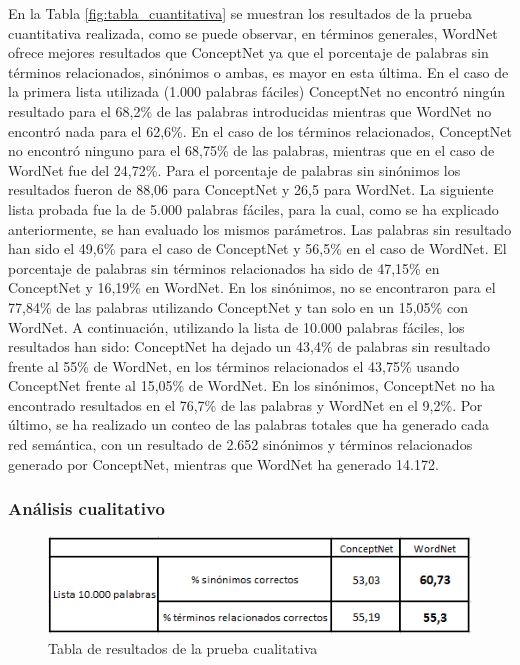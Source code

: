 En la Tabla \ref{fig:tabla_cuantitativa} se muestran los resultados de la prueba cuantitativa realizada, como se puede observar, en términos generales, WordNet ofrece mejores resultados que ConceptNet ya que el porcentaje de palabras sin términos relacionados, sinónimos o ambas, es mayor en esta última. En el caso de la primera lista utilizada (1.000 palabras fáciles) ConceptNet no encontró ningún resultado para el 68,2\% de las palabras introducidas mientras que WordNet no encontró nada para el 62,6\%. En el caso de los términos relacionados, ConceptNet no encontró ninguno para el 68,75\% de las palabras, mientras que en el caso de WordNet fue del 24,72\%. Para el porcentaje de palabras sin sinónimos los resultados fueron de 88,06 para ConceptNet y 26,5 para WordNet. La siguiente lista probada fue la de 5.000 palabras fáciles, para la cual, como se ha explicado anteriormente, se han evaluado los mismos parámetros. Las palabras sin resultado han sido el 49,6\% para el caso de ConceptNet y 56,5\% en el caso de WordNet. El porcentaje de palabras sin términos relacionados ha sido de 47,15\% en ConceptNet y 16,19\% en WordNet. En los sinónimos, no se encontraron para el 77,84\% de las palabras utilizando ConceptNet  y tan solo en un 15,05\% con WordNet. A continuación, utilizando la lista de 10.000 palabras fáciles, los resultados han sido: ConceptNet ha dejado un 43,4\% de palabras sin resultado frente al 55\% de WordNet, en los términos relacionados el 43,75\% usando ConceptNet  frente al 15,05\% de WordNet. En los sinónimos, ConceptNet no ha encontrado resultados en el 76,7\% de las palabras y WordNet en el 9,2\%. Por último, se ha realizado un conteo de las palabras totales que ha generado cada red semántica, con un resultado de 2.652 sinónimos y términos relacionados generado por ConceptNet, mientras que WordNet ha generado 14.172.



\subsubsection{Análisis cualitativo}
\label{sssec:pruebaCualitativa}

\begin{figure}[!h]
	\includegraphics[width=1.0\textwidth]{Imagenes/Bitmap/Capitulo4/tabla_cualitativa}
	\caption{Tabla de resultados de la prueba cualitativa}
	\label{fig:tabla_cualitativa}
\end{figure}

